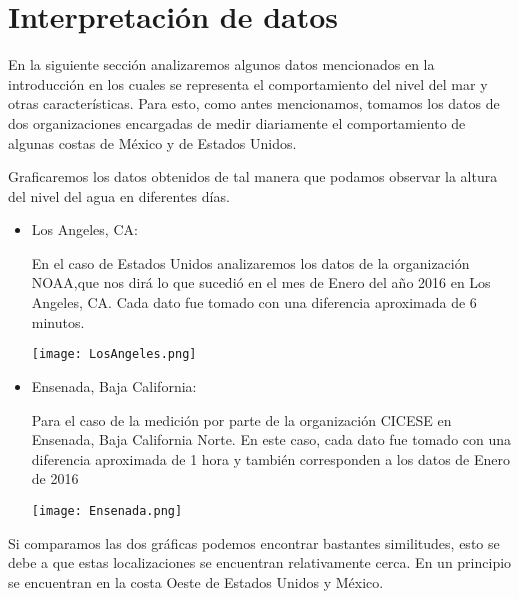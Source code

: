 \newpage
\section{Interpretación de datos}
\noindent En la siguiente sección analizaremos algunos datos mencionados en la introducción en los cuales se representa el comportamiento del nivel del mar y otras características. Para esto, como antes mencionamos, tomamos los datos de dos organizaciones encargadas de medir diariamente el comportamiento de algunas costas de México y de Estados Unidos. 

Graficaremos los datos obtenidos de tal manera que podamos observar la altura del nivel del agua en diferentes días.

\begin{itemize}
\item Los Angeles, CA:

En el caso de Estados Unidos analizaremos los datos de la organización NOAA,que nos dirá lo que sucedió en el mes de Enero del año 2016 en Los Angeles, CA. Cada dato fue tomado con una diferencia aproximada de 6 minutos.
\begin{center}
\texttt{[image: LosAngeles.png]}
\end{center}

\newpage
\item Ensenada, Baja California:

Para el caso de la medición por parte de la organización CICESE en Ensenada, Baja California Norte. En este caso, cada dato fue tomado con una diferencia aproximada de 1 hora y también corresponden a los datos de Enero de 2016
\begin{center}
\texttt{[image: Ensenada.png]}
\end{center}
\end{itemize}

Si comparamos las dos gráficas podemos encontrar bastantes similitudes, esto se debe a que estas localizaciones se encuentran relativamente cerca. En un principio se encuentran en la costa Oeste de Estados Unidos y México. 

